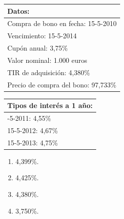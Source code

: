 \documentclass[
  letterpaper,
  DIV=11,
  numbers=noendperiod]{scrartcl}
\begin{document}
\begin{longtable}[]{@{}l@{}}
\toprule\noalign{}
\textbf{Datos:} \\
\midrule\noalign{}
\endhead
\bottomrule\noalign{}
\endlastfoot
Compra de bono en fecha: 15-5-2010 \\
Vencimiento: 15-5-2014 \\
Cupón anual: 3,75\% \\
Valor nominal: 1.000 euros \\
TIR de adquisición: 4,380\% \\
Precio de compra del bono: 97,733\% \\
\end{longtable}

\begin{longtable}[]{@{}l@{}}
\toprule\noalign{}
Tipos de interés a 1 año: \\
\midrule\noalign{}
\endhead
\bottomrule\noalign{}
\endlastfoot
15-5-2011: 4,55\% \\
15-5-2012: 4,67\% \\
15-5-2013: 4,75\% \\
\end{longtable}

\begin{enumerate}
\def\labelenumi{\alph{enumi})}
\item
  4,399\%.
\item
  4,425\%.
\item
  4,380\%.
\item
  3,750\%.
\end{enumerate}
\end{document}
